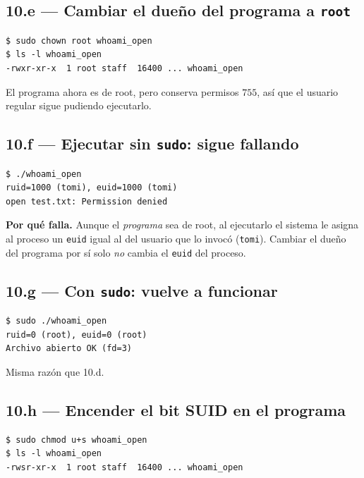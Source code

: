 \documentclass[11pt,a4paper]{article}
\begin{document}
\subsection*{10.e --- Cambiar el dueño del programa a \texttt{root}}

\begin{lstlisting}[style=shellstyle]
$ sudo chown root whoami_open
$ ls -l whoami_open
-rwxr-xr-x  1 root staff  16400 ... whoami_open
\end{lstlisting}

El programa ahora es de root, pero conserva permisos $755$, así que el
usuario regular sigue pudiendo ejecutarlo.

\subsection*{10.f --- Ejecutar sin \texttt{sudo}: sigue fallando}

\begin{lstlisting}[style=shellstyle]
$ ./whoami_open
ruid=1000 (tomi), euid=1000 (tomi)
open test.txt: Permission denied
\end{lstlisting}

\textbf{Por qué falla.} Aunque el \emph{programa} sea de root, al
ejecutarlo el sistema le asigna al proceso un \texttt{euid} igual al
del usuario que lo invocó (\texttt{tomi}). Cambiar el dueño del
programa por sí solo \emph{no} cambia el \texttt{euid} del proceso.

\subsection*{10.g --- Con \texttt{sudo}: vuelve a funcionar}

\begin{lstlisting}[style=shellstyle]
$ sudo ./whoami_open
ruid=0 (root), euid=0 (root)
Archivo abierto OK (fd=3)
\end{lstlisting}

Misma razón que 10.d.

\subsection*{10.h --- Encender el bit SUID en el programa}

\begin{lstlisting}[style=shellstyle]
$ sudo chmod u+s whoami_open
$ ls -l whoami_open
-rwsr-xr-x  1 root staff  16400 ... whoami_open
\end{lstlisting}
\end{document}

